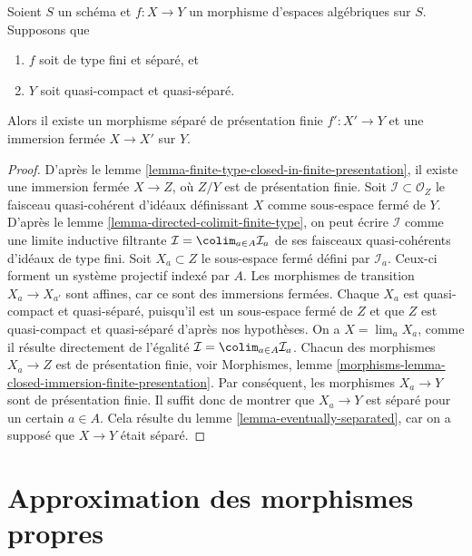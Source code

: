 \begin{proposition}
\label{proposition-separated-closed-in-finite-presentation}
Soient $S$ un schéma et $f : X \to Y$ un morphisme d'espaces algébriques
sur $S$. Supposons que
\begin{enumerate}
\item $f$ soit de type fini et séparé, et
\item $Y$ soit quasi-compact et quasi-séparé.
\end{enumerate}
Alors il existe un morphisme séparé de présentation finie
$f' : X' \to Y$ et une immersion fermée $X \to X'$ sur $Y$.
\end{proposition}

\begin{proof}
D'après le lemme \ref{lemma-finite-type-closed-in-finite-presentation},
il existe une immersion fermée $X \to Z$, où $Z/Y$ est de
présentation finie. Soit $\mathcal{I} \subset \mathcal{O}_Z$
le faisceau quasi-cohérent d'idéaux définissant $X$ comme
sous-espace fermé de $Y$. D'après le
lemme \ref{lemma-directed-colimit-finite-type},
on peut écrire $\mathcal{I}$ comme une limite inductive filtrante
$\mathcal{I} = \colim_{a \in A} \mathcal{I}_a$ de ses
faisceaux quasi-cohérents d'idéaux de type fini.
Soit $X_a \subset Z$ le sous-espace fermé défini par $\mathcal{I}_a$.
Ceux-ci forment un système projectif indexé par $A$.
Les morphismes de transition $X_a \to X_{a'}$ sont affines, car
ce sont des immersions fermées. Chaque $X_a$ est quasi-compact et quasi-séparé,
puisqu'il est un sous-espace fermé de $Z$ et que $Z$ est quasi-compact et
quasi-séparé d'après nos hypothèses.
On a $X = \lim_a X_a$, comme il résulte directement de
l'égalité $\mathcal{I} = \colim_{a \in A} \mathcal{I}_a$.
Chacun des morphismes $X_a \to Z$ est de présentation finie, voir
Morphismes, lemme \ref{morphisms-lemma-closed-immersion-finite-presentation}.
Par conséquent, les morphismes $X_a \to Y$ sont de présentation finie.
Il suffit donc de montrer que $X_a \to Y$ est séparé pour un certain
$a \in A$. Cela résulte du lemme \ref{lemma-eventually-separated},
car on a supposé que $X \to Y$ était séparé.
\end{proof}






\section{Approximation des morphismes propres}
\label{section-approximate-proper}

